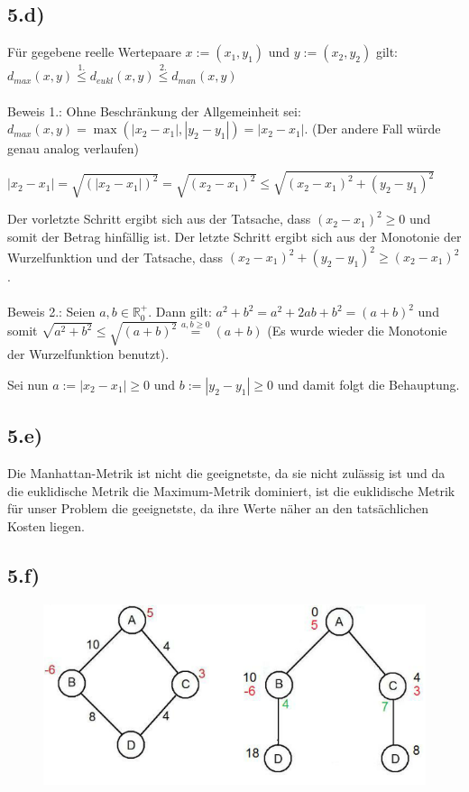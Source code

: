 \documentclass[a4paper]{article}
\newcommand{\IR}{\mathbb{R}}
\begin{document}
\subsection*{5.d)}
F\"ur gegebene reelle Wertepaare $x:=(x_1,y_1)$ und $y:=(x_2,y_2)$ gilt:
$d_{max}(x,y) \stackrel{1.}{\leq} d_{eukl}(x,y) \stackrel{2.}{\leq} d_{man}(x,y)$\\
\\
Beweis 1.: Ohne Beschr\"ankung der Allgemeinheit sei: $d_{max}(x,y) = \max(|x_2- x_1|,|y_2- y_1|) = |x_2- x_1|$.
(Der andere Fall w\"urde genau analog verlaufen)

$|x_2-x_1|=\sqrt{(|x_2-x_1|)^2}=\sqrt{(x_2-x_1)^2}\leq\sqrt{(x_2-x_1)^2+ (y_2-y_1)^2}$

Der vorletzte Schritt ergibt sich aus der Tatsache, dass $(x_2-x_1)^2\geq0$ und somit der
Betrag hinf\"allig ist. Der letzte Schritt ergibt sich aus der Monotonie der Wurzelfunktion
und der Tatsache, dass $(x_2- x_1)^2+(y_2- y_1)^2\geq(x_2- x_1)^2$.\\
\\
Beweis 2.: Seien $a,b \in \IR^+_0$. Dann gilt: $a^2+ b^2= a^2+ 2ab + b^2= (a + b)^2$ und somit $\sqrt{a^2+b^2}\leq\sqrt{(a + b)^2} \stackrel{a,b\geq0}{=}(a + b)$ (Es wurde wieder die Monotonie der Wurzelfunktion
benutzt).

Sei nun $a := |x_2- x_1| \geq 0$ und $b :=|y_2- y_1| \geq 0$ und damit folgt die Behauptung.

\subsection*{5.e)}
Die Manhattan-Metrik ist nicht die geeignetste, da sie nicht zul\"assig ist und da die euklidische Metrik die Maximum-Metrik dominiert, ist die euklidische Metrik f\"ur unser Problem die geeignetste, da ihre Werte n\"aher an den tats\"achlichen Kosten liegen.

\subsection*{5.f)}

\begin{figure}[h]
\centering
\includegraphics[width=0.75\columnwidth]{aufgabe5f}
\end{figure}
\end{document}
